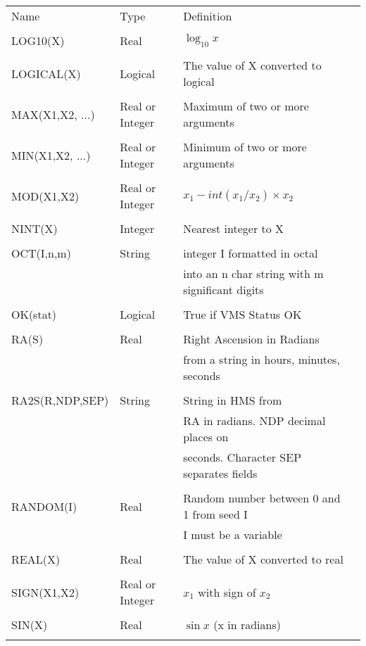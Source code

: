 \documentclass[twoside,11pt]{report}
\begin{document}
\newpage
\begin{center}
\begin{tabular}{llll}
Name & Type & Definition \\
\\
LOG10(X) & Real & $\log_{10} x $\\
\\
LOGICAL(X) & Logical & The value of X converted to logical \\
\\
MAX(X1,X2, ...) & Real or Integer & Maximum of two or more arguments \\
\\
MIN(X1,X2, ...) & Real or Integer & Minimum of two or more arguments \\
\\
MOD(X1,X2) & Real or Integer & $x_{1} - int(x_{1}/x_{2}) \times x_{2}$ \\
\\
NINT(X) & Integer & Nearest integer to X \\
\\
OCT(I,n,m) & String & integer I formatted in octal \\
 & & into an n char string with m significant digits \\
\\
OK(stat) & Logical & True if VMS Status OK \\
\\
RA(S) & Real & Right Ascension in Radians \\
  & & from a string in hours, minutes, seconds \\
\\
RA2S(R,NDP,SEP) & String & String in HMS from \\
  & & RA in radians. NDP decimal places on \\
  & & seconds. Character SEP separates fields \\
\\
RANDOM(I) & Real & Random number between 0 and 1 from seed I \\
     & &  I must be a variable \\
\\
REAL(X) & Real & The value of X converted to real\\
\\
SIGN(X1,X2) & Real or Integer & $x_{1}$ with sign of $x_{2}$ \\
\\
SIN(X) & Real & $\sin x$ (x in radians) \\
\\

\end{tabular}
\end{center}
\end{document}
